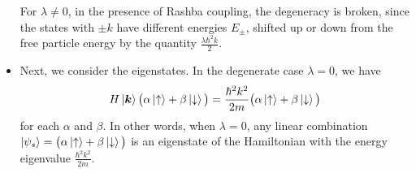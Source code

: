 \documentclass[11pt, a4paper]{article}
\renewcommand{\vec}[1]{\bm{#1}} %
\newcommand{\ua}{\uparrow}  %
\newcommand{\da}{\downarrow}  %
\renewcommand{\k}{\vec{k}}  %
\begin{document}
\begin{itemize}
	For $ \lambda \neq 0 $, in the presence of Rashba coupling, the degeneracy is broken, since the states with $ \pm k $ have different energies $ E_{\pm} $, shifted up or down from the free particle energy by the quantity $ \frac{\lambda \hbar^{2}k}{2} $.
	
	\item Next, we consider the eigenstates. In the degenerate case $ \lambda = 0 $, we have
	\begin{equation*}
		H \ket{\k} \big(\alpha \ket{\ua} + \beta \ket{\da}\big) = \frac{\hbar^{2}k^{2}}{2m}\big(\alpha \ket{\ua} + \beta \ket{\da}\big)
	\end{equation*}
	for each $ \alpha $ and $ \beta $. In other words, when $ \lambda = 0 $, any linear combination $ \ket{\psi_{s}} = \big(\alpha \ket{\ua} + \beta \ket{\da}\big) $ is an eigenstate of the Hamiltonian with the energy eigenvalue $  \frac{\hbar^{2}k^{2}}{2m} $.
	

\end{itemize}
\end{document}
